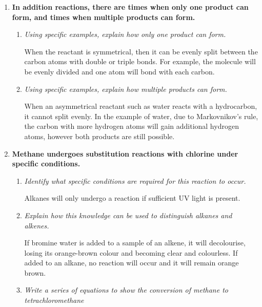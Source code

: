 \documentclass{report}
\begin{document}
\begin{enumerate}
		\item \textbf{In addition reactions, there are times when only one product can form, and times when multiple products can form.}

			\begin{enumerate}
				\item \textit{Using specific examples, explain how only one product can form.}

					When the reactant is symmetrical, then it can be evenly split between the carbon atoms with double or triple bonds. For example, the molecule  will be evenly divided and one  atom will bond with each carbon.

				\item \textit{Using specific examples, explain how multiple products can form.}

					When an asymmetrical reactant such as water reacts with a hydrocarbon, it cannot split evenly. In the example of water, due to Markovnikov's rule, the carbon with more hydrogen atoms will gain additional hydrogen atoms, however both products are still possible.
			\end{enumerate}

		\item \textbf{Methane undergoes substitution reactions with chlorine under specific conditions.}
			\begin{enumerate}
				\item \textit{Identify what specific conditions are required for this reaction to occur.}
					
					Alkanes will only undergo a reaction if sufficient UV light is present.

				\item \textit{Explain how this knowledge can be used to distinguish alkanes and alkenes.}

					If bromine water is added to a sample of an alkene, it will decolourise, losing its orange-brown colour and becoming clear and colourless. If added to an alkane, no reaction will occur and it will remain orange brown.

				\item \textit{Write a series of equations to show the conversion of methane to tetrachloromethane}

					\begin{center}
						 \\
						 \\
						 \\
					\end{center}
			\end{enumerate}


\end{enumerate}
\end{document}
